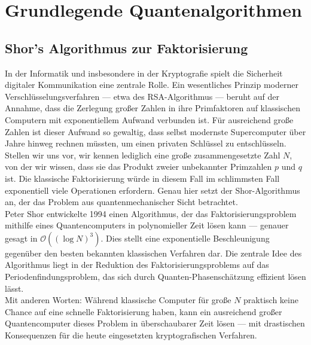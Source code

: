 \chapter{Grundlegende Quantenalgorithmen}
\label{basic_algorithms} %




\section{Shor's Algorithmus zur Faktorisierung}

In der Informatik und insbesondere in der Kryptografie spielt die Sicherheit digitaler Kommunikation eine zentrale Rolle. Ein wesentliches Prinzip moderner Verschlüsselungsverfahren — etwa des RSA-Algorithmus — beruht auf der Annahme, dass die Zerlegung großer Zahlen in ihre Primfaktoren auf klassischen Computern mit exponentiellem Aufwand verbunden ist. Für ausreichend große Zahlen ist dieser Aufwand so gewaltig, dass selbst modernste Supercomputer über Jahre hinweg rechnen müssten, um einen privaten Schlüssel zu entschlüsseln.\\

Stellen wir uns vor, wir kennen lediglich eine große zusammengesetzte Zahl $N$, von der wir wissen, dass sie das Produkt zweier unbekannter Primzahlen $p$ und $q$ ist. Die klassische Faktorisierung würde in diesem Fall im schlimmsten Fall exponentiell viele Operationen erfordern. Genau hier setzt der Shor-Algorithmus an, der das Problem aus quantenmechanischer Sicht betrachtet.\\

Peter Shor entwickelte 1994 einen Algorithmus, der das Faktorisierungsproblem mithilfe eines Quantencomputers in polynomieller Zeit lösen kann — genauer gesagt in $\mathcal{O}((\log N)^3)$. Dies stellt eine exponentielle Beschleunigung gegenüber den besten bekannten klassischen Verfahren dar. Die zentrale Idee des Algorithmus liegt in der Reduktion des Faktorisierungsproblems auf das Periodenfindungsproblem, das sich durch Quanten-Phasenschätzung effizient lösen lässt.\\

Mit anderen Worten: Während klassische Computer für große $N$ praktisch keine Chance auf eine schnelle Faktorisierung haben, kann ein ausreichend großer Quantencomputer dieses Problem in überschaubarer Zeit lösen — mit drastischen Konsequenzen für die heute eingesetzten kryptografischen Verfahren.\\

